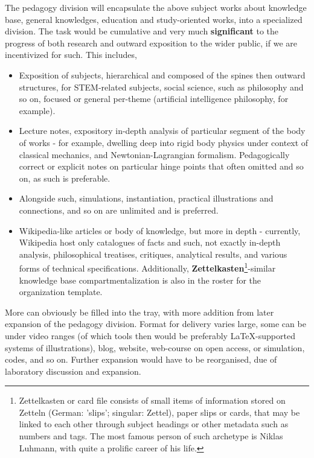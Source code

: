 \documentclass[9pt,a4paper]{article}
\begin{document}
The pedagogy division will encapsulate the above subject works about knowledge base, general knowledges, education and study-oriented works, into a specialized division. The task would be cumulative and very much \textbf{significant} to the progress of both research and outward exposition to the wider public, if we are incentivized for such. This includes, 
\begin{itemize}[itemsep=1pt,topsep=1pt]
    \item Exposition of subjects, hierarchical and composed of the spines then outward structures, for STEM-related subjects, social science, such as philosophy and so on, focused or general per-theme (artificial intelligence philosophy, for example).
    \item Lecture notes, expository in-depth analysis of particular segment of the body of works - for example, dwelling deep into rigid body physics under context of classical mechanics, and Newtonian-Lagrangian formalism. Pedagogically correct or explicit notes on particular hinge points that often omitted and so on, as such is preferable. 
    \item Alongside such, simulations, instantiation, practical illustrations and connections, and so on are unlimited and is preferred. 
    \item Wikipedia-like articles or body of knowledge, but more in depth - currently, Wikipedia host only catalogues of facts and such, not exactly in-depth analysis, philosophical treatises, critiques, analytical results, and various forms of technical specifications. Additionally, \textbf{Zettelkasten}\footnote{Zettelkasten or card file consists of small items of information stored on Zetteln (German: 'slips'; singular: Zettel), paper slips or cards, that may be linked to each other through subject headings or other metadata such as numbers and tags. The most famous person of such archetype is Niklas Luhmann, with quite a prolific career of his life.}-similar knowledge base compartmentalization is also in the roster for the organization template. 
\end{itemize}
More can obviously be filled into the tray, with more addition from later expansion of the pedagogy division. Format for delivery varies large, some can be under video ranges (of which tools then would be preferably \LaTeX-supported systems of illustrations), blog, website, web-course on open access, or simulation, codes, and so on. Further expansion would have to be reorganised, due of laboratory discussion and expansion. 
\end{document}
